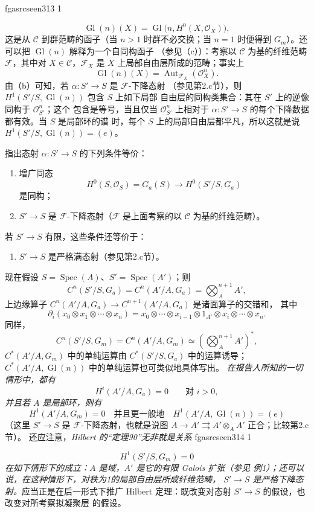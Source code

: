 \documentclass[12pt,twoside,openany]{book}
\numberwithin{equation}{section}
\newcommand{\fgaunitid}{unbound}
\newcommand{\src}[1]{%
  \phantomsection
  \hypertarget{src:\fgaunitid:#1}{}%
  \hypertarget{fga.\fgaunitid.p#1}{}%
  \ifcsname fgasrcseen#1\endcsname\else
    \expandafter\gdef\csname fgasrcseen#1\endcsname{1}%
    \hypertarget{src:#1}{}%
  \fi
  \marginpar{\raggedleft\footnotesize\sffamily #1}%
}
\newcommand{\fquote}[1]{“#1”}
\theoremstyle{plain}
\theoremstyle{definition}
\theoremstyle{remark}
\begin{document}
\src{313}
\[
  \operatorname{Gl}(n)(X)=
  \operatorname{Gl}\bigl(n,H^0(X,\mathcal O_X)\bigr),
\]
这是从 $\mathcal C$ 到群范畴的函子（当 $n>1$ 时群不必交换；当 $n=1$
时便得到 $G_m$）。还可以把 $\operatorname{Gl}(n)$ 解释为一个自同构函子
（参见（c））：考察以 $\mathcal C$ 为基的纤维范畴 $\mathcal F$，其中对
$X\in\mathcal C$，$\mathcal F_X$ 是 $X$ 上局部自由层所成的范畴；事实上
\[
  \operatorname{Gl}(n)(X)=
  \operatorname{Aut}_{\mathcal F_X}(\mathcal O_X^n).
\]
由（b）可知，若 $\alpha:S'\longrightarrow S$ 是 $\mathcal F$-下降态射
（参见第2.c节），则 $H^1(S'/S,\operatorname{Gl}(n))$ 包含 $S$ 上如下局部
自由层的同构类集合：其在 $S'$ 上的逆像同构于 $\mathcal O_{S'}^n$；这个
包含是等号，当且仅当 $\mathcal O_{S'}^n$ 上相对于
$\alpha:S'\longrightarrow S$ 的每个下降数据都有效。当 $S$ 是局部环的谱
时，每个 $S$ 上的局部自由层都平凡，所以这就是说
$H^1(S'/S,\operatorname{Gl}(n))=(e)$。

指出态射 $\alpha:S'\longrightarrow S$ 的下列条件等价：
\begin{enumerate}
\item[(i)] 增广同态
\[
  H^0(S,\mathcal O_S)=G_a(S)\longrightarrow H^0(S'/S,G_a)
\]
是同构；
\item[(ii)] $S'\longrightarrow S$ 是 $\mathcal F$-下降态射（$\mathcal F$
是上面考察的以 $\mathcal C$ 为基的纤维范畴）。
\end{enumerate}
若 $S'\longrightarrow S$ 有限，这些条件还等价于：
\begin{enumerate}
\item[(iii)] $S'\longrightarrow S$ 是严格满态射（参见第2.c节）。
\end{enumerate}

现在假设 $S=\operatorname{Spec}(A)$、$S'=\operatorname{Spec}(A')$；则
\[
  C^n(S'/S,G_a)=C^n(A'/A,G_a)=\bigotimes_A^{n+1}A',
\]
上边缘算子
$C^n(A'/A,G_a)\longrightarrow C^{n+1}(A'/A,G_a)$ 是诸面算子的交错和，
其中
\[
  \partial_i(x_0\otimes x_1\otimes\cdots\otimes x_n)
  =x_0\otimes\cdots\otimes x_{i-1}\otimes1_{A'}\otimes
   x_i\otimes\cdots\otimes x_n.
\]
同样，
\[
  C^n(S'/S,G_m)=C^n(A'/A,G_m)
  \simeq\left(\bigotimes_A^{n+1}A'\right)^*,
\]
$C^*(A'/A,G_m)$ 中的单纯运算由 $C^*(S'/S,G_a)$ 中的运算诱导；
$C^*(A'/A,\operatorname{Gl}(n))$ 中的单纯运算也可类似地具体写出。
\emph{在报告人所知的一切情形中，都有}
\[
  H^i(A'/A,G_a)=0\qquad\text{对 $i>0$},
\]
\emph{并且若 $A$ 是局部环，则有}
\[
  H^1(A'/A,G_m)=0
  \quad\text{并且更一般地}\quad
  H^1(A'/A,\operatorname{Gl}(n))=(e)
\]
（这里 $S'\longrightarrow S$ 是 $\mathcal F$-下降态射，也就是说图
$A\longrightarrow A'\rightrightarrows A'\otimes_AA'$ 正合；比较第2.c节）。
还应注意，\emph{Hilbert 的\fquote{定理90}无非就是关系}
\src{314}
\[
  H^1(S'/S,G_m)=0
\]
\emph{在如下情形下的成立：$A$ 是域，$A'$ 是它的有限 Galois 扩张（参见
例1）；还可以说，在这种情形下，对秩为1的局部自由层所成纤维范畴，
$S'\longrightarrow S$ 是严格下降态射。}应当正是在后一形式下推广 Hilbert
定理：既改变对态射 $S'\longrightarrow S$ 的假设，也改变对所考察拟凝聚层
的假设。
\end{document}
